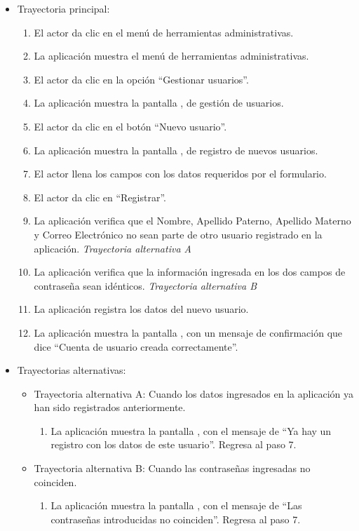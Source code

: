 			\begin{itemize}
				\item Trayectoria principal:
					\begin{enumerate}
						\item El actor da clic en el menú de herramientas administrativas.
						\item La aplicación muestra el menú de herramientas administrativas.
						\item El actor da clic en la opción ``Gestionar usuarios''.
						\item La aplicación muestra la pantalla , de gestión de usuarios.
						\item El actor da clic en el botón ``Nuevo usuario''.
						\item La aplicación muestra la pantalla , de registro de nuevos usuarios.
						\item El actor llena los campos con los datos requeridos por el formulario.
						\item El actor da clic en ``Registrar''.
						\item La aplicación verifica que el Nombre, Apellido Paterno, Apellido Materno y Correo Electrónico no sean parte de otro usuario registrado en la aplicación. \textsl{Trayectoria alternativa A}
						\item La aplicación verifica que la información ingresada en los dos campos de contraseña sean idénticos. \textsl{Trayectoria alternativa B}
						\item La aplicación registra los datos del nuevo usuario.
						\item La aplicación muestra la pantalla , con un mensaje de confirmación que dice ``Cuenta de usuario creada correctamente''.
					\end{enumerate}
				\item Trayectorias alternativas:
					\begin{itemize}
						\item Trayectoria alternativa A: Cuando los datos ingresados en la aplicación ya han sido registrados anteriormente.
							\begin{enumerate}
								\item La aplicación muestra la pantalla , con el mensaje de ``Ya hay un registro con los datos de este usuario''. Regresa al paso 7.
							\end{enumerate}
						\item Trayectoria alternativa B: Cuando las contraseñas ingresadas no coinciden.
							\begin{enumerate}
								\item La aplicación muestra la pantalla , con el mensaje de ``Las contraseñas introducidas no coinciden''. Regresa al paso 7.
							\end{enumerate}
					\end{itemize}
			\end{itemize}
			
